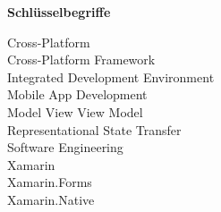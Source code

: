%
%
% 
% 

\begin{center}
{\Large\bfseries Schlüsselbegriffe}
\end{center}

\noindent
Cross-Platform\\
Cross-Platform Framework\\
Integrated Development Environment\\
Mobile App Development\\
Model View View Model\\
Representational State Transfer\\
Software Engineering\\
Xamarin\\
Xamarin.Forms\\
Xamarin.Native\\
